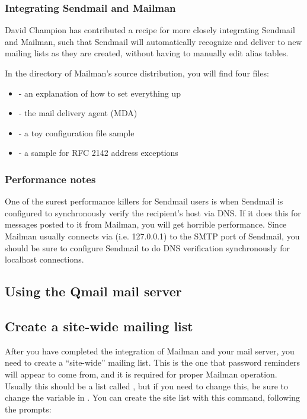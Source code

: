 \documentclass{howto}
\begin{document}
\subsubsection{Integrating Sendmail and Mailman}

David Champion has contributed a recipe for more closely integrating Sendmail
and Mailman, such that Sendmail will automatically recognize and deliver to
new mailing lists as they are created, without having to manually edit alias
tables.

In the  directory of Mailman's source distribution, you will
find four files:

\begin{itemize}
\item {} - an explanation of how to set everything up
\item {}        - the mail delivery agent (MDA)
\item {}        - a toy configuration file sample
\item {}     - a sample for RFC 2142 address exceptions
\end{itemize}

\subsubsection{Performance notes}

One of the surest performance killers for Sendmail users is when Sendmail is
configured to synchronously verify the recipient's host via DNS.  If it does
this for messages posted to it from Mailman, you will get horrible
performance.  Since Mailman usually connects via 
(i.e. 127.0.0.1) to the SMTP port of Sendmail, you should be sure to configure
Sendmail to  do DNS verification synchronously for localhost
connections.

\subsection{Using the Qmail mail server}

\subsection{Create a site-wide mailing list}

After you have completed the integration of Mailman and your mail server, you
need to create a ``site-wide'' mailing list.  This is the one that password
reminders will appear to come from, and it is required for proper Mailman
operation.  Usually this should be a list called , but if you
need to change this, be sure to change the  variable in
.  You can create the site list with this command, following
the prompts:
\end{document}
